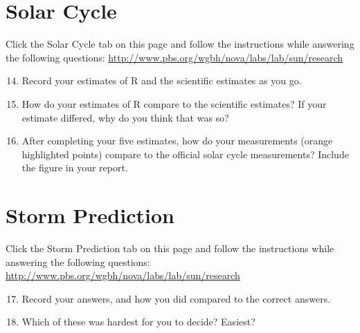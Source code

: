 \documentclass[12pt]{article}%
\begin{document}
\section{Solar Cycle}\label{sec:cycle}
Click the Solar Cycle tab on this page and follow the instructions while
answering the following questions:
\url{http://www.pbs.org/wgbh/nova/labs/lab/sun/research}
\begin{enumerate}
\setcounter{enumi}{13}
\item Record your estimates of R and the scientific estimates as you go.
\item How do your estimates of R compare to the scientific estimates?  If your estimate differed, why do you think that was so?
\item After completing your five estimates, how do your measurements (orange highlighted points) compare to the official solar cycle measurements? Include the figure in your report.
\end{enumerate}


\section{Storm Prediction}\label{sec:storm-pred}

Click the Storm Prediction tab on this page and follow the instructions
while answering the following questions:
\url{http://www.pbs.org/wgbh/nova/labs/lab/sun/research}
\begin{enumerate}
\setcounter{enumi}{16}
\item Record your answers, and how you did compared to the correct answers.
\item Which of these was hardest for you to decide?  Easiest?
\end{enumerate}
\end{document}
